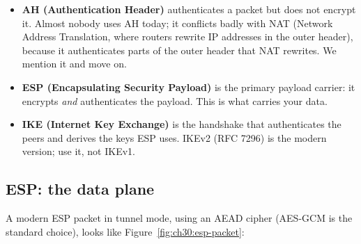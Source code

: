 \begin{itemize}
\item \textbf{AH (Authentication Header)} authenticates a packet but does not encrypt it. Almost nobody uses AH today; it conflicts badly with NAT (Network Address Translation, where routers rewrite IP addresses in the outer header), because it authenticates parts of the outer header that NAT rewrites. We mention it and move on.
\item \textbf{ESP (Encapsulating Security Payload)} is the primary payload carrier: it encrypts \emph{and} authenticates the payload. This is what carries your data.
\item \textbf{IKE (Internet Key Exchange)} is the handshake that authenticates the peers and derives the keys ESP uses. IKEv2 (RFC 7296) is the modern version; use it, not IKEv1.
\end{itemize}

\subsection{ESP: the data plane}

A modern ESP packet in tunnel mode, using an AEAD cipher (AES-GCM is the standard choice), looks like Figure~\ref{fig:ch30:esp-packet}:

